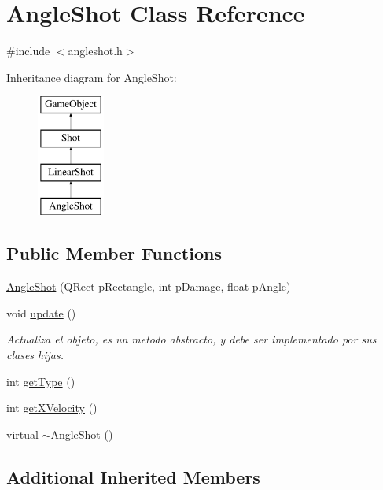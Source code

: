 \hypertarget{class_angle_shot}{\section{Angle\-Shot Class Reference}
\label{class_angle_shot}
}


{\ttfamily \#include $<$angleshot.\-h$>$}

Inheritance diagram for Angle\-Shot\-:\begin{figure}[H]
\begin{center}
\leavevmode
\includegraphics[height=4.000000cm]{class_angle_shot}
\end{center}
\end{figure}
\subsection*{Public Member Functions}
\begin{DoxyCompactItemize}
\item 
\hyperlink{class_angle_shot_ae25e86a55ee3c18b1c8be4731729059d}{Angle\-Shot} (Q\-Rect p\-Rectangle, int p\-Damage, float p\-Angle)
\item 
void \hyperlink{class_angle_shot_a15e9f45aedf1a47836b0c603a758dd20}{update} ()
\begin{DoxyCompactList}\small\item\em Actualiza el objeto, es un metodo abstracto, y debe ser implementado por sus clases hijas. \end{DoxyCompactList}\item 
int \hyperlink{class_angle_shot_a690154e0ae49ac8667046f0c4a9c1647}{get\-Type} ()
\item 
int \hyperlink{class_angle_shot_a7e51f41031536ff1086055eab24d544d}{get\-X\-Velocity} ()
\item 
virtual \hyperlink{class_angle_shot_af12cb94bb36cfcfd02108d0f74d2655c}{$\sim$\-Angle\-Shot} ()
\end{DoxyCompactItemize}
\subsection*{Additional Inherited Members}


